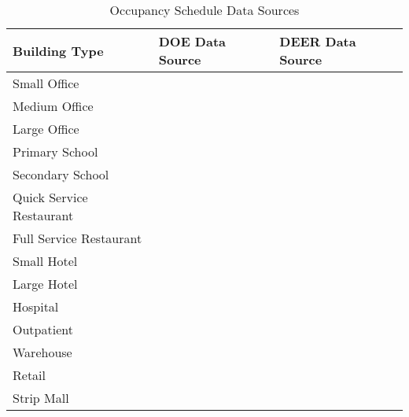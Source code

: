 \begin{table}
\small
\centering
\caption{Occupancy Schedule Data Sources}
\label{tab:occupancy_schedule_source}
\begin{tabular}{|l|l|l|} 
\hline
\textbf{Building Type}   & \textbf{DOE Data Source} & \textbf{DEER Data Source}  \\ 
\hline
Small Office             & \cite{ashrae_1989}    & \cite{cpuc_deer}       \\ 
\hline
Medium Office            & \cite{ashrae_1989}  & \cite{cpuc_deer}           \\ 
\hline
Large Office             & \cite{ashrae_1989}    & \cite{cpuc_deer}        \\ 
\hline
Primary School           & \cite{pless_2007}   & \cite{cpuc_deer}  \\ 
\hline
Secondary School         & \cite{pless_2007}  & \cite{cpuc_deer}   \\ 
\hline
Quick Service Restaurant & \cite{ashrae_1989} & \cite{cpuc_deer}          \\ 
\hline
Full Service Restaurant  & \cite{ashrae_1989} & \cite{cpuc_deer}        \\ 
\hline
Small Hotel              & \cite{jiang_2008}  & \cite{cpuc_deer}   \\ 
\hline
Large Hotel              & \cite{jiang_2008}  & \cite{cpuc_deer}   \\ 
\hline
Hospital                 & \cite{doebber_2009}  & \cite{cpuc_deer} \\ 
\hline
Outpatient               & \cite{doebber_2009}  & \cite{cpuc_deer} \\ 
\hline
Warehouse                & \cite{liu_2007}     & \cite{cpuc_deer}  \\ 
\hline
Retail                   & \cite{ashrae_1989}   & \cite{cpuc_deer}        \\ 
\hline
Strip Mall               & \cite{ashrae_1989}   & \cite{cpuc_deer}        \\
\hline
\end{tabular}
\end{table}